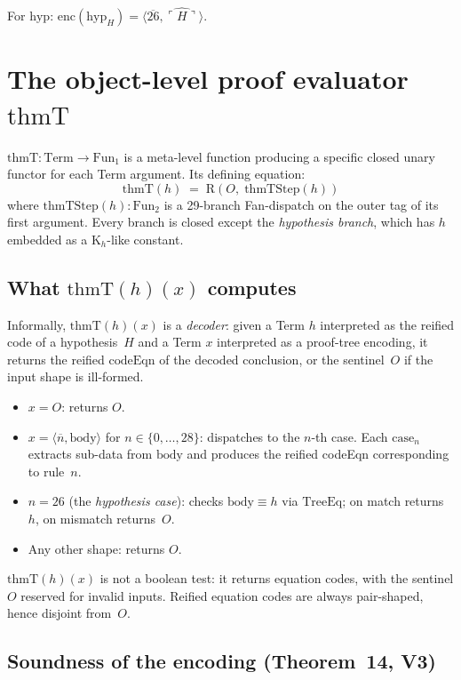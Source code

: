 \documentclass[11pt]{article}
\newcommand{\pair}[2]{\langle #1, #2 \rangle}
\newcommand{\nat}[1]{\overline{#1}}
\newcommand{\code}[1]{\ulcorner #1 \urcorner}
\newcommand{\reify}[1]{\widehat{#1}}
\newcommand{\thmT}{\mathrm{thmT}}
\newcommand{\TreeEq}{\mathrm{TreeEq}}
\begin{document}
For $\mathrm{hyp}$: $\mathrm{enc}(\mathrm{hyp}_H) = \pair{\nat{26}}{\reify{\code{H}}}$.

\section{The object-level proof evaluator $\thmT$}
\label{sec:thmT}

$\thmT : \mathrm{Term} \to \mathrm{Fun}_1$ is a meta-level function
producing a specific closed unary functor for each Term argument.
Its defining equation:
\[
  \thmT(h) \;=\; \mathrm{R}(O,\; \thmT\mathrm{Step}(h))
\]
where $\thmT\mathrm{Step}(h) : \mathrm{Fun}_2$ is a 29-branch
Fan-dispatch on the outer tag of its first argument.  Every branch
is closed except the \emph{hypothesis branch}, which has $h$
embedded as a $\mathrm{K}_h$-like constant.

\subsection{What $\thmT(h)(x)$ computes}

Informally, $\thmT(h)(x)$ is a \emph{decoder}: given a Term $h$
interpreted as the reified code of a hypothesis~$H$ and a Term $x$
interpreted as a proof-tree encoding, it returns the reified
$\mathrm{codeEqn}$ of the decoded conclusion, or the sentinel~$O$
if the input shape is ill-formed.

\begin{itemize}
\item $x = O$: returns $O$.
\item $x = \pair{\nat{n}}{\mathrm{body}}$ for $n \in \{0, \ldots, 28\}$:
  dispatches to the $n$-th case.  Each $\mathrm{case}_n$ extracts
  sub-data from $\mathrm{body}$ and produces the reified codeEqn
  corresponding to rule~$n$.
\item $n = 26$ (the \emph{hypothesis case}): checks $\mathrm{body} \equiv h$
  via $\TreeEq$; on match returns~$h$, on mismatch returns~$O$.
\item Any other shape: returns $O$.
\end{itemize}

$\thmT(h)(x)$ is not a boolean test: it returns equation codes,
with the sentinel $O$ reserved for invalid inputs.  Reified equation
codes are always pair-shaped, hence disjoint from~$O$.

\subsection{Soundness of the encoding (Theorem~14, V3)}
\end{document}

